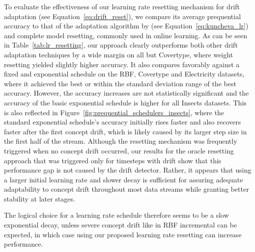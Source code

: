 \documentclass[letterpaper]{article} %
\begin{document}
To evaluate the effectiveness of our learning rate resetting mechanism for drift adaptation (see Equation~\ref{eq:drift_reset}), we compare its average prequential accuracy to that of the adaptation algorithm by \citet{kunchevaAdaptiveLearningRate2008}(see Equation~\ref{eq:kuncheva_lr}) and complete model resetting, commonly used in online learning.
As can be seen in Table~\ref{tab:lr_resetting}, our approach clearly outperforms both other drift adaptation techniques by a wide margin on all but Covertype, where weight resetting yielded slightly higher accuracy.
It also compares favorably against a fixed and exponential schedule on the RBF, Covertype and Electricity datasets, where it achieved the best or within the standard deviation range of the best accuracy.
However, the accuracy increases are not statistically significant and the accuracy of the basic exponential schedule is higher for all Insects datasets.
This is also reflected in Figure~\ref{fig:prequential_schedulers_insects}, where the standard exponential schedule's accuracy initially rises faster and also recovers faster after the first concept drift, which is likely caused by its larger step size in the first half of the stream.
Although the resetting mechanism was frequently triggered when no concept drift occurred, our results for the oracle resetting approach that was triggered only for timesteps with drift show that this performance gap is not caused by the drift detector.
Rather, it appears that using a larger initial learning rate and slower decay is sufficient for assuring adequate adaptability to concept drift throughout most data streams while granting better stability at later stages.

The logical choice for a learning rate schedule therefore seems to be a slow exponential decay, unless severe concept drift like in RBF incremental can be expected, in which case using our proposed learning rate resetting can increase performance.
\end{document}
